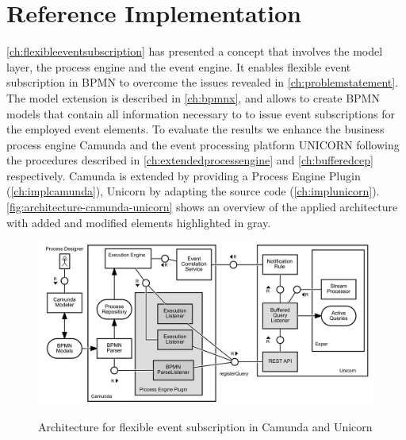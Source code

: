 \chapter{Reference Implementation}\label{ch:implementation}

\autoref{ch:flexibleeventsubscription} has presented a concept that involves the model layer, the process engine and the event engine.
It enables flexible event subscription in BPMN to overcome the issues revealed in \autoref{ch:problemstatement}.
The model extension is described in \autoref{ch:bpmnx}, and allows to create BPMN models that contain all information necessary to to issue event subscriptions for the employed event elements.
To evaluate the results we enhance the business process engine Camunda and the event processing platform UNICORN following the procedures described in \autoref{ch:extendedprocessengine} and \autoref{ch:bufferedcep} respectively.
Camunda is extended by providing a Process Engine Plugin (\autoref{ch:implcamunda}), Unicorn by adapting the source code (\autoref{ch:implunicorn}).
\autoref{fig:architecture-camunda-unicorn} shows an overview of the applied architecture with added and modified elements highlighted in gray.

\begin{figure}[]
	\myfloatalign
	{\hspace*{-2.3cm}\includegraphics[width=1.3\linewidth]{chapters/implementation/flexible-evt-subscr-camunda-unicorn.png}}
	\caption{Architecture for flexible event subscription in Camunda and Unicorn}
	\label{fig:architecture-camunda-unicorn}
\end{figure}


